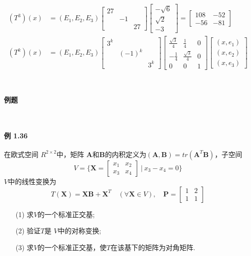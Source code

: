 \documentclass[12pt, a4paper, oneside, fontset=none]{ctexart}
\begin{document}
\begin{align*}
    (T^3)(x) & = (E_1,E_2,E_3)
    \begin{bmatrix}
        27 &    &    \\
           & -1 &    \\
           &    & 27
    \end{bmatrix}
    \begin{bmatrix}
        -\sqrt{6} \\
        \sqrt{2}  \\
        -3
    \end{bmatrix}
    = \begin{bmatrix}
          108 & -52 \\
          -56 & -81
      \end{bmatrix}           \\
    (T^k)(x) & = (E_1,E_2,E_3)
    \begin{bmatrix}
        3^k &        &     \\
            & (-1)^k &     \\
            &        & 3^k
    \end{bmatrix}
    \begin{bmatrix}
        \frac{\sqrt{3}}{4} & \frac{1}{4}        & 0 \\
        -\frac{1}{4}       & \frac{\sqrt{3}}{4} & 0 \\
        0                  & 0                  & 1
    \end{bmatrix}
    \begin{bmatrix}
        (x,e_1) \\
        (x,e_2) \\
        (x,e_3)
    \end{bmatrix}
\end{align*}
\par \ \par

\centerline{\large{\textbf{例题}}} \ \par

\paragraph*{例 1.36} 在欧式空间 $R^{2\times 2}$中，矩阵 $\bm{A}$和$\bm{B}$的内积定义为$(\bm{A},\bm{B}) = tr(\bm{A}^T\bm{B})$，子空间
\[
    V = \biggl\{\bm{X} = \begin{bmatrix}
        x_1 & x_2 \\
        x_3 & x_4
    \end{bmatrix}\ \bigg| \ x_3 - x_4 = 0\biggr\}
\]
$V$中的线性变换为
\[
    T(\bm{X}) = \bm{XB} + \bm{X}^T \quad (\forall \bm{X} \in V), \quad \bm{P} = \begin{bmatrix}
        1 & 2 \\
        1 & 1
    \end{bmatrix}
\]
\begin{enumerate}
    \item[(1)] 求$V$的一个标准正交基;
    \item[(2)] 验证$T$是 $V$中的对称变换;
    \item[(3)] 求$V$的一个标准正交基，使$T$在该基下的矩阵为对角矩阵.
\end{enumerate}
\end{document}

